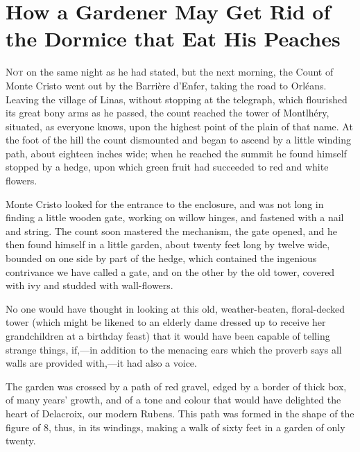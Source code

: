 \chapter{How a Gardener May Get Rid of the Dormice that Eat His Peaches} 

 \lettrine{N}{ot} on the same night as he had stated, but the next morning, the Count of Monte Cristo went out by the Barrière d'Enfer, taking the road to Orléans. Leaving the village of Linas, without stopping at the telegraph, which flourished its great bony arms as he passed, the count reached the tower of Montlhéry, situated, as everyone knows, upon the highest point of the plain of that name. At the foot of the hill the count dismounted and began to ascend by a little winding path, about eighteen inches wide; when he reached the summit he found himself stopped by a hedge, upon which green fruit had succeeded to red and white flowers. 

 Monte Cristo looked for the entrance to the enclosure, and was not long in finding a little wooden gate, working on willow hinges, and fastened with a nail and string. The count soon mastered the mechanism, the gate opened, and he then found himself in a little garden, about twenty feet long by twelve wide, bounded on one side by part of the hedge, which contained the ingenious contrivance we have called a gate, and on the other by the old tower, covered with ivy and studded with wall-flowers. 

 No one would have thought in looking at this old, weather-beaten, floral-decked tower (which might be likened to an elderly dame dressed up to receive her grandchildren at a birthday feast) that it would have been capable of telling strange things, if,—in addition to the menacing ears which the proverb says all walls are provided with,—it had also a voice. 

 The garden was crossed by a path of red gravel, edged by a border of thick box, of many years' growth, and of a tone and colour that would have delighted the heart of Delacroix, our modern Rubens. This path was formed in the shape of the figure of 8, thus, in its windings, making a walk of sixty feet in a garden of only twenty. 

